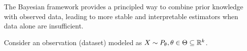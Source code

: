 The Bayesian framework provides a principled way to combine prior knowledge with observed data, leading to more stable and interpretable estimators when data alone are insufficient.



%
%
%
%
%
Consider an observation (dataset) modeled as \(X \sim P_{\theta}, \theta \in \Theta \subseteq \mathbb{R}^{k}\).
